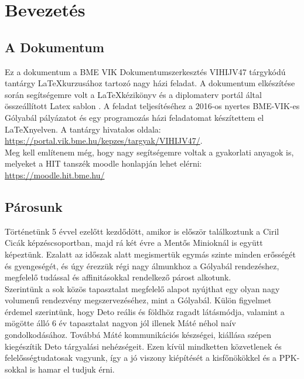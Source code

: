 \chapter{Bevezetés}\label{sect:Intoduction}

\section{A Dokumentum}
\hspace{2mm} Ez a dokumentum a BME VIK Dokumentumszerkesztés VIHIJV47 tárgykódú tantárgy \LaTeX kurzusához tartozó nagy házi feladat. A dokumentum elkészítése során segítségemre volt a \LaTeX kézikönyv \cite{Wettl04} és a diplomaterv portál által összeállított Latex sablon \cite{DipPortal}. A feladat teljesítéséhez a 2016-os nyertes BME-VIK-es Gólyabál pályázatot \cite{GolyaBal} és egy programozás házi feladatomat készítettem el \LaTeX nyelven. A tantárgy hivatalos oldala: \url{https://portal.vik.bme.hu/kepzes/targyak/VIHIJV47/}.\\ 
\indent Meg kell említenem még, hogy nagy segítségemre voltak a gyakorlati anyagok is, melyeket a HIT tanszék moodle honlapján lehet elérni: \url{https://moodle.hit.bme.hu/}

\section{Párosunk}
\hspace{2mm} Történetünk 5 évvel ezelőtt kezdődött, amikor is először találkoztunk a Ciril Cicák képzéscsoportban, majd rá két évre a Mentős Minioknál is együtt képeztünk. Ezalatt az időszak alatt megismertük egymás szinte minden erősségét és gyengeségét, és úgy érezzük régi nagy álmunkhoz a Gólyabál rendezéshez, megfelelő tudással és affinitásokkal rendelkező párost alkotunk.\\
\indent Szerintünk a sok közös tapasztalat megfelelő alapot nyújthat egy olyan nagy volumenű rendezvény megszervezéséhez, mint a Gólyabál. Külön figyelmet érdemel szerintünk, hogy Deto reális és földhöz ragadt látásmódja, valamint a mögötte álló 6 év tapasztalat nagyon jól illenek Máté néhol naív gondolkodásához. Továbbá Máté kommunikációs készségei, kiállása szépen kiegészítik Deto tárgyalási nehézségeit. Ezen kívül mindketten közvetlenek és felelősségtudatosak vagyunk, így a jó viszony kiépítését a kisfőnökökkel és a PPK-sokkal is hamar el tudjuk érni.